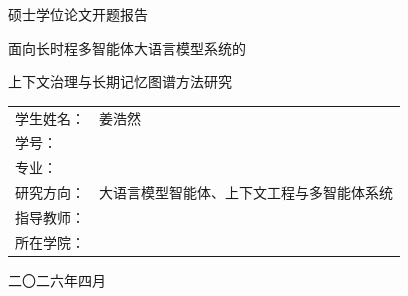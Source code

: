 \documentclass[UTF8,a4paper,zihao=-4,fontset=windows]{ctexart}
\newcommand{\reporttitle}{面向长时程多智能体大语言模型系统的上下文治理与长期记忆图谱方法研究}
\newcommand{\framework}{象群-星鸦框架}
\newcommand{\blankline}{\underline{\hspace{5.2cm}}}
\begin{document}
\begin{titlepage}
  \centering
  \vspace*{1.2cm}
  {\heiti 硕士学位论文开题报告\par}
  \vspace{1.1cm}
  {\heiti 面向长时程多智能体大语言模型系统的\par}
  \vspace{0.25cm}
  {\heiti 上下文治理与长期记忆图谱方法研究\par}
  \vspace{2.0cm}
  \begin{tabular}{>{\heiti}p{3.2cm}p{8cm}}
    学生姓名： & 姜浩然\\[0.45cm]
    学号： & \blankline\\[0.45cm]
    专业： & \blankline\\[0.45cm]
    研究方向： & 大语言模型智能体、上下文工程与多智能体系统\\[0.45cm]
    指导教师： & \blankline\\[0.45cm]
    所在学院： & \blankline\\[0.45cm]
  \end{tabular}
  \vfill
  {二〇二六年四月\par}
\end{titlepage}

\begin{abstract}
随着大语言模型智能体从单轮问答逐步发展为能够规划、检索、调用工具、跨角色协作并持续保持状态的长时程系统，智能体系统的关键问题已经不再只是单次回答质量，而是如何在有限上下文预算、跨轮任务状态、跨智能体协作和长期经验复用之间保持稳定治理。现有自主智能体、多智能体系统、长上下文建模、提示压缩、检索增强生成和长期记忆研究为该问题提供了重要基础，但仍较少将运行内上下文治理、跨运行长期记忆组织、预算约束下的提示构造与事件中心可观测性统一建模。

本课题拟基于现有研究稿件《\reporttitle》展开硕士论文研究，将原统一稿件转化为一个总论与两个机制章节相互支撑的论文结构。研究拟提出\framework：其中，象群上下文管理策略负责运行内多智能体协作中的显著性排序、证据保留、上下文压缩和跨角色传递；克拉克星鸦长时记忆图谱机制负责将高价值执行经验提升为长期记忆胶囊，组织为包含任务、证据、时间、冲突和修正关系的记忆图谱，并在未来任务中以局部子图或摘要形式安全返回；MGCM 记忆治理层负责候选记忆的提升、验证、降级和废弃；长时程注意力、预算感知压缩和事件中心可观测性共同支撑系统连续执行、提示构造和失败诊断。

论文计划围绕五类研究问题展开实验：统一框架在长时程任务上的整体收益，象群上下文治理在高干扰上下文中的证据保留能力，长期记忆图谱在 recall、reuse、陈旧记忆抑制和冲突消解方面的表现，长时程注意力与上下文压缩在预算收缩下的鲁棒性，以及事件中心可观测性对任务轨迹重建和故障定位的作用。预期形成一套面向长时程多智能体大语言模型系统的上下文治理与长期记忆方法框架，为智能体底层编排框架、长时程任务执行和可解释系统评测提供可复现的理论建模、工程实现和实验依据。

\textbf{关键词：} 大语言模型智能体；多智能体系统；上下文治理；长期记忆图谱；象群上下文管理策略；克拉克星鸦长时记忆；MGCM；事件中心可观测性
\end{abstract}
\end{document}

